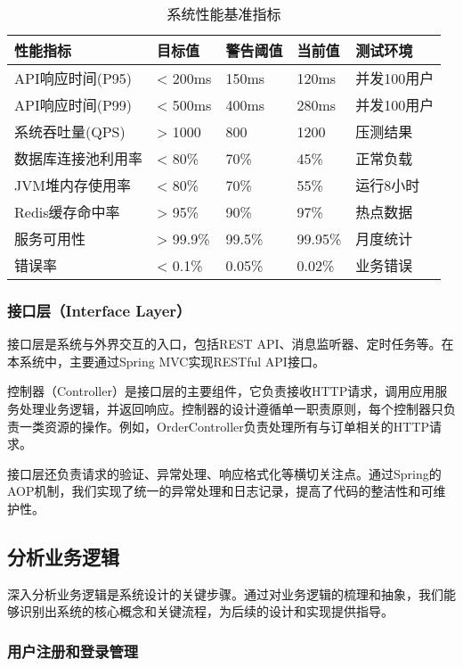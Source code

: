 \documentclass[a4paper,12pt]{article}
\begin{document}
\begin{table}[H]
\centering
\caption{系统性能基准指标}
\begin{tabular}{|p{3cm}|p{2.5cm}|p{2.5cm}|p{2.5cm}|p{2.5cm}|}
\hline
\textbf{性能指标} & \textbf{目标值} & \textbf{警告阈值} & \textbf{当前值} & \textbf{测试环境} \\
\hline
API响应时间(P95) & < 200ms & 150ms & 120ms & 并发100用户 \\
\hline
API响应时间(P99) & < 500ms & 400ms & 280ms & 并发100用户 \\
\hline
系统吞吐量(QPS) & > 1000 & 800 & 1200 & 压测结果 \\
\hline
数据库连接池利用率 & < 80\% & 70\% & 45\% & 正常负载 \\
\hline
JVM堆内存使用率 & < 80\% & 70\% & 55\% & 运行8小时 \\
\hline
Redis缓存命中率 & > 95\% & 90\% & 97\% & 热点数据 \\
\hline
服务可用性 & > 99.9\% & 99.5\% & 99.95\% & 月度统计 \\
\hline
错误率 & < 0.1\% & 0.05\% & 0.02\% & 业务错误 \\
\hline
\end{tabular}
\end{table}

\subsubsection{接口层（Interface Layer）}

接口层是系统与外界交互的入口，包括REST API、消息监听器、定时任务等。在本系统中，主要通过Spring MVC实现RESTful API接口。

控制器（Controller）是接口层的主要组件，它负责接收HTTP请求，调用应用服务处理业务逻辑，并返回响应。控制器的设计遵循单一职责原则，每个控制器只负责一类资源的操作。例如，OrderController负责处理所有与订单相关的HTTP请求。

接口层还负责请求的验证、异常处理、响应格式化等横切关注点。通过Spring的AOP机制，我们实现了统一的异常处理和日志记录，提高了代码的整洁性和可维护性。

\subsection{分析业务逻辑}

深入分析业务逻辑是系统设计的关键步骤。通过对业务逻辑的梳理和抽象，我们能够识别出系统的核心概念和关键流程，为后续的设计和实现提供指导。

\subsubsection{用户注册和登录管理}
\end{document}
